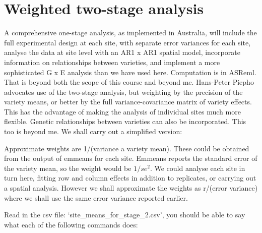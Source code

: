 \documentclass[
]{book}
\newenvironment{Shaded}{\begin{snugshade}}{\end{snugshade}}
\newcommand{\AttributeTok}[1]{\textcolor[rgb]{0.77,0.63,0.00}{#1}}
\newcommand{\CommentTok}[1]{\textcolor[rgb]{0.56,0.35,0.01}{\textit{#1}}}
\newcommand{\DecValTok}[1]{\textcolor[rgb]{0.00,0.00,0.81}{#1}}
\newcommand{\FloatTok}[1]{\textcolor[rgb]{0.00,0.00,0.81}{#1}}
\newcommand{\FunctionTok}[1]{\textcolor[rgb]{0.00,0.00,0.00}{#1}}
\newcommand{\NormalTok}[1]{#1}
\newcommand{\OtherTok}[1]{\textcolor[rgb]{0.56,0.35,0.01}{#1}}
\newcommand{\SpecialCharTok}[1]{\textcolor[rgb]{0.00,0.00,0.00}{#1}}
\newcommand{\StringTok}[1]{\textcolor[rgb]{0.31,0.60,0.02}{#1}}
\begin{document}
\hypertarget{weighted-two-stage-analysis}{%
\section{Weighted two-stage analysis}\label{weighted-two-stage-analysis}}

A comprehensive one-stage analysis, as implemented in Australia, will include the full experimental design at each site, with separate error variances for each site, analyse the data at site level with an AR1 x AR1 spatial model, incorporate information on relationships between varieties, and implement a more sophisticated G x E analysis than we have used here. Computation is in ASReml. That is beyond both the scope of this course and beyond me. Hans-Peter Piepho advocates use of the two-stage analysis, but weighting by the precision of the variety means, or better by the full variance-covariance matrix of variety effects. This has the advantage of making the analysis of individual sites much more flexible. Genetic relationships between varieties can also be incorporated. This too is beyond me. We shall carry out a simplified version:

Approximate weights are 1/(variance a variety mean). These could be obtained from the output of emmeans for each site. Emmeans reports the standard error of the variety mean, so the weight would be \(1/se^2\). We could analyse each site in turn here, fitting row and column effects in addition to replicates, or carrying out a spatial analysis. However we shall approximate the weights as r/(error variance) where we shall use the same error variance reported earlier.

Read in the csv file: `site\_means\_for\_stage\_2.csv', you should be able to say what each of the following commands does:

\begin{Shaded}
\end{Shaded}
\end{document}
